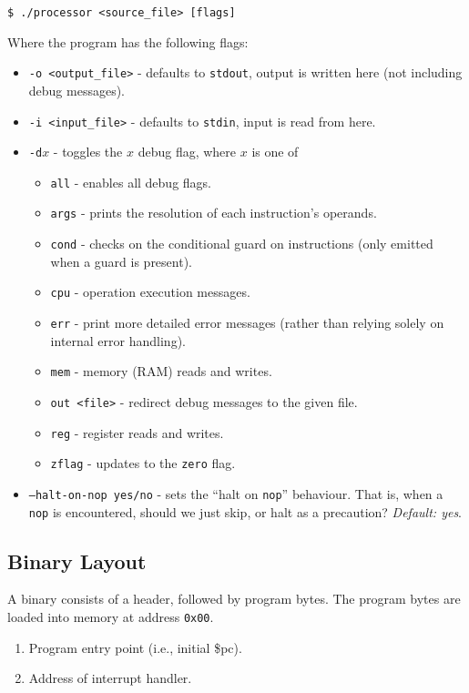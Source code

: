 \documentclass[10pt]{article}
\begin{document}
    \medskip
    \begin{lstlisting}[style=bashconsole]
$ ./processor <source_file> [flags]
    \end{lstlisting}

    Where the program has the following flags:
    \begin{itemize}
        \item \texttt{-o <output\_file>} - defaults to \texttt{stdout}, output is written here (not including debug messages).
        \item \texttt{-i <input\_file>} - defaults to \texttt{stdin}, input is read from here.
        \item \texttt{-d$x$} - toggles the $x$ debug flag, where $x$ is one of
        \begin{itemize}
            \item \texttt{all} - enables all debug flags.
            \item \texttt{args} - prints the resolution of each instruction's operands.
            \item \texttt{cond} - checks on the conditional guard on instructions (only emitted when a guard is present).
            \item \texttt{cpu} - operation execution messages.
            \item \texttt{err} - print more detailed error messages (rather than relying solely on internal error handling).
            \item \texttt{mem} - memory (RAM) reads and writes.
            \item \texttt{out <file>} - redirect debug messages to the given file.
            \item \texttt{reg} - register reads and writes.
            \item \texttt{zflag} - updates to the \texttt{zero} flag.
        \end{itemize}
        \item \texttt{--halt-on-nop yes/no} - sets the ``halt on \texttt{nop}'' behaviour.
        That is, when a \texttt{nop} is encountered, should we just skip, or halt as a precaution?
        \textit{Default: yes}.
    \end{itemize}

    \subsection{Binary Layout}

    A binary consists of a header, followed by program bytes.
    The program bytes are loaded into memory at address \texttt{0x00}.
    \begin{enumerate}
        \item Program entry point (i.e., initial \$pc).
        \item Address of interrupt handler.
    \end{enumerate}
\end{document}
